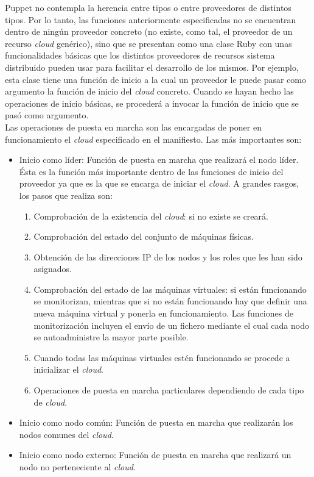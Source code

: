 Puppet no contempla la herencia entre tipos o entre proveedores de distintos tipos. Por lo tanto, las funciones anteriormente especificadas no se encuentran dentro de ningún proveedor concreto (no existe, como tal, el proveedor de un recurso \emph{cloud} genérico), sino que se presentan como una clase Ruby con unas funcionalidades básicas que los distintos proveedores de recursos sistema distribuido pueden usar para facilitar el desarrollo de los mismos. Por ejemplo, esta clase tiene una función de inicio a la cual un proveedor le puede pasar como argumento la función de inicio del \emph{cloud} concreto. Cuando se hayan hecho las operaciones de inicio básicas, se procederá a invocar la función de inicio que se pasó como argumento. \\

Las operaciones de puesta en marcha son las encargadas de poner en funcionamiento el \emph{cloud} especificado en el manifiesto. Las más importantes son:

\begin{itemize}
\item Inicio como líder: Función de puesta en marcha que realizará el nodo líder. Ésta es la función más importante dentro de las funciones de inicio del proveedor ya que es la que se encarga de iniciar el \emph{cloud}. A grandes rasgos, los pasos que realiza son:

   \begin{enumerate}
   \item Comprobación de la existencia del \emph{cloud}: si no existe se creará.
   \item Comprobación del estado del conjunto de máquinas físicas.
   \item Obtención de las direcciones IP de los nodos y los roles que les han sido asignados.
   \item Comprobación del estado de las máquinas virtuales: si están funcionando se monitorizan, mientras que si no están funcionando hay que definir una nueva máquina virtual y ponerla en funcionamiento. Las funciones de monitorización incluyen el envío de un fichero mediante el cual cada nodo se autoadministre la mayor parte posible.
   \item Cuando todas las máquinas virtuales estén funcionando se procede a inicializar el \emph{cloud}.
   \item Operaciones de puesta en marcha particulares dependiendo de cada tipo de \emph{cloud}.
   \end{enumerate}

\item Inicio como nodo común: Función de puesta en marcha que realizarán los nodos comunes del \emph{cloud}.
\item Inicio como nodo externo: Función de puesta en marcha que realizará un nodo no perteneciente al \emph{cloud}.
\end{itemize}

